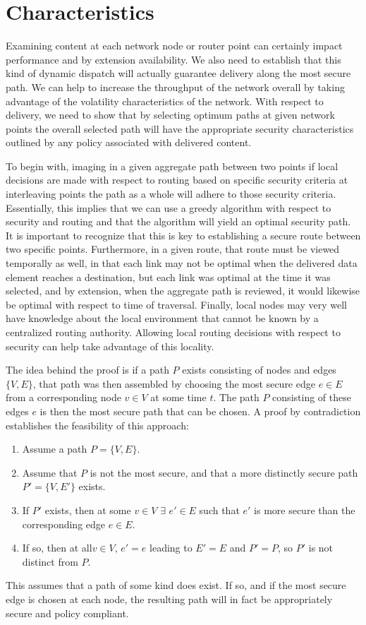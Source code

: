 \section{Characteristics}
\label{section:characteristics}
Examining content at each network node or router point can certainly impact performance and by extension availability.  We also need to establish that this kind of dynamic dispatch will actually guarantee delivery along the most secure path.  We can help to increase the throughput of the network overall by taking advantage of the volatility characteristics of the network.  With respect to delivery, we need to show that by selecting optimum paths at given network points the overall selected path will have the appropriate security characteristics outlined by any policy associated with delivered content.

To begin with, imaging in a given aggregate path between two points if local decisions are made with respect to routing based on specific security criteria at interleaving points the path as a whole will adhere to those security criteria.  Essentially, this implies that we can use a greedy algorithm with respect to security and routing and that the algorithm will yield an optimal security path.  It is important to recognize that this is key to establishing a secure route between two specific points.  Furthermore, in a given route, that route must be viewed temporally as well, in that each link may not be optimal when the delivered data element reaches a destination, but each link was optimal at the time it was selected, and by extension, when the aggregate path is reviewed, it would likewise be optimal with respect to time of traversal.  Finally, local nodes may very well have knowledge about the local environment that cannot be known by a centralized routing authority.  Allowing local routing decisions with respect to security can help take advantage of this locality.

The idea behind the proof is if a path $P$ exists consisting of nodes and edges $\lbrace V, E \rbrace$, that path was then assembled by choosing the most secure edge $e \in E$ from a corresponding node $v \in V$ at some time $t$.  The path $P$ consisting of these edges $e$ is then the most secure path that can be chosen.  A proof by contradiction establishes the feasibility of this approach:

\begin{enumerate}
\item Assume a path $P = \lbrace V, E \rbrace$.
\item Assume that $P$ is not the most secure, and that a more distinctly secure path $P' = \lbrace V, E' \rbrace$ exists.
\item If $P'$ exists, then at some $v \in V$ $\exists$ $e' \in E$ such that $e'$ is more secure than the corresponding edge $e \in E$.
\item If so, then at all$v \in V$, $e' = e$ leading to $E' = E$ and $P' = P$, so $P'$ is not distinct from $P$. 
\end{enumerate}

This assumes that a path of some kind does exist.  If so, and if the most secure edge is chosen at each node, the resulting path will in fact be appropriately secure and policy compliant.
